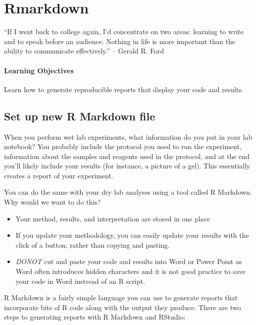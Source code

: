 \documentclass[
]{book}
\begin{document}
\hypertarget{rmarkdown}{%
\chapter{Rmarkdown}\label{rmarkdown}}

``If I went back to college again, I'd concentrate on two areas: learning to write and to speak before an audience. Nothing in life is more important than the ability to communicate effectively.''
-- Gerald R. Ford

\hypertarget{learning-objectives}{%
\subsubsection*{Learning Objectives}\label{learning-objectives}}

Learn how to generate reproducible reports that display your code and results.

\hypertarget{set-up-new-r-markdown-file}{%
\section{Set up new R Markdown file}\label{set-up-new-r-markdown-file}}

When you perform wet lab experiments, what information do you put in your lab notebook? You probably include the protocol you used to run the experiment, information about the samples and reagents used in the protocol, and at the end you'll likely include your results (for instance, a picture of a gel). This essentially creates a report of your experiment.

You can do the same with your dry lab analyses using a tool called R Markdown. Why would we want to do this?

\begin{itemize}
\item
  Your method, results, and interpretation are stored in one place
\item
  If you update your methodology, you can easily update your results with the click of a button, rather than copying and pasting.
\item
  \emph{DONOT} cut and paste your code and results into Word or Power Point as Word often introduces hidden characters and it is not good practice to save your code in Word instread of an R script.
\end{itemize}

R Markdown is a fairly simple language you can use to generate reports that incorporate bits of R code along with the output they produce. There are two steps to generating reports with R Markdown and RStudio:
\end{document}
